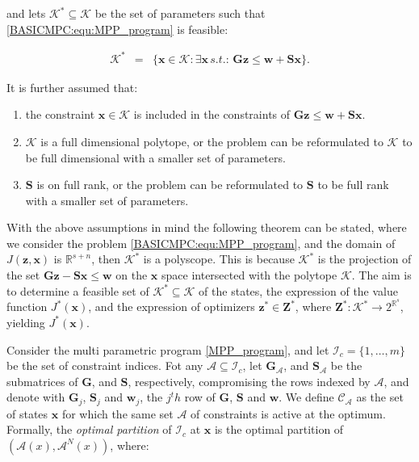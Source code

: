     and lets $\mathcal{K}^*\subseteq\mathcal{K}$ be the set of parameters such that \ref{BASICMPC:equ:MPP_program} is feasible:

    \begin{equation}
    \begin{array}{rcl}
            \mathcal{K}^*&=&\{\textbf{x}\in\mathcal{K}:\exists\textbf{x}\,s.t.:\,\textbf{Gz}\leq\textbf{w}+\textbf{Sx}\}.
        \end{array}
        \label{BASICMPC:equ:MPP_stateset_params}
    \end{equation}

    It is further assumed that:
    \begin{enumerate}
    \item the constraint $\textbf{x}\in\mathcal{K}$ is included in the constraints of $\textbf{Gz}\leq\textbf{w}+\textbf{Sx}$.
    \item $\mathcal{K}$ is a full dimensional polytope, or the problem can be reformulated to $\mathcal{K}$ to be full dimensional with a smaller set of parameters.
    \item $\textbf{S}$ is on full rank, or the problem can be reformulated to $\textbf{S}$ to be full rank with a smaller set of parameters.
    \end{enumerate}

    With the above assumptions in mind the following theorem can be stated, where we consider the problem \ref{BASICMPC:equ:MPP_program}, and the domain of $J(\textbf{z},\textbf{x})$ is $\mathbb{R}^{s+n}$, then $\mathcal{K}^*$ is a polyscope. This is because $\mathcal{K}^*$ is the projection of the set $\textbf{Gz}-\textbf{Sx}\leq\textbf{w}$ on the $\textbf{x}$ space intersected with the polytope $\mathcal{K}$. The aim is to determine a feasible set of $\mathcal{K}^*\subseteq\mathcal{K}$ of the states, the expression of the value function $J^*(\textbf{x})$, and the expression of optimizers $\textbf{z}^*\in\textbf{Z}^*$, where $\textbf{Z}^*:\mathcal{K}^*\rightarrow 2^{\mathbb{R}^s}$, yielding $J^*(\textbf{x})$.

    \label{BASICCSR:sec:MPP_Critical}

    Consider the multi parametric program \ref{MPP_program}, and let $\mathcal{I}_c=\{1,\dots,m\}$ be the set of constraint indices. Fot any $\mathcal{A}\subseteq\mathcal{I}_c$, let $\textbf{G}_{\mathcal{A}}$, and $\textbf{S}_{\mathcal{A}}$ be the submatrices of $\textbf{G}$, and $\textbf{S}$, respectively, compromising the rows indexed by $\mathcal{A}$, and denote with $\textbf{G}_j$, $\textbf{S}_j$ and $\textbf{w}_j$, the $j^th$ row of $\textbf{G}$, $\textbf{S}$ and $\textbf{w}$. We define $\mathcal{C}_{\mathcal{A}}$ as the set of states $\textbf{x}$ for which the same set $\mathcal{A}$ of constraints is active at the optimum. Formally, the \emph{optimal partition} of $\mathcal{I}_c$ at $\textbf{x}$ is the optimal partition of $(\mathcal{A}(x),\mathcal{A}^N(x))$, where:

